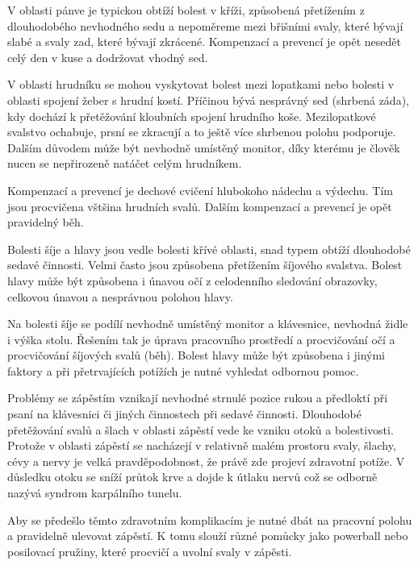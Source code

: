 
V oblasti pánve je typickou obtíží bolest v kříži, způsobená přetížením z dlouhodobého nevhodného sedu a nepoměreme mezi břišními svaly, které bývají slabé a svaly zad, které bývají zkrácené. Kompenzací a prevencí je opět nesedět celý den v kuse a dodržovat vhodný sed. 


V oblasti hrudníku se mohou vyskytovat bolest mezi lopatkami nebo bolesti v oblasti spojení žeber s hrudní kostí. Příčinou bývá nesprávný sed (shrbená záda), kdy dochází k přetěžování kloubních spojení hrudního koše. Mezilopatkové svalstvo ochabuje, prsní se zkracují a to ještě více shrbenou polohu podporuje. Dalším důvodem může být nevhodně umístěný monitor, díky kterému je člověk nucen se nepřirozeně natáčet celým hrudníkem. 

Kompenzací a prevencí je dechové cvičení hlubokoho nádechu a výdechu. Tím jsou procvičena vštšina hrudních svalů. Dalším kompenzací a prevencí je opět pravidelný běh.


Bolesti šíje a hlavy jsou vedle bolesti křívé oblasti, snad typem obtíží dlouhodobé sedavé činnosti. Velmi často jsou způsobena přetížením šíjového svalstva. Bolest hlavy může být způsobena i únavou očí z celodenního sledování obrazovky, celkovou únavou a nesprávnou polohou hlavy.

Na bolesti šíje se podílí nevhodně umístěný monitor a klávesnice, nevhodná židle i výška stolu. Řešením tak je úprava pracovního prostředí a procvičování očí a procvičování šíjových svalů (běh). Bolest hlavy může být způsobena i jinými faktory a při přetrvajících potížích je nutné vyhledat odbornou pomoc.


Problémy se zápěstím vznikají nevhodné strnulé pozice rukou a předloktí při psaní na klávesnici či jiných činnostech při sedavé činnosti. Dlouhodobé přetěžování svalů a šlach v oblasti zápěstí vede ke vzniku otoků a bolestivosti. Protože v oblasti zápěstí se nacházejí v relativně malém prostoru svaly, šlachy, cévy a nervy je velká pravděpodobnost, že právě zde projeví zdravotní potíže. V důsledku otoku se sníží průtok krve a dojde k útlaku nervů což se odborně nazývá syndrom karpálního tunelu. 

Aby se předešlo těmto zdravotním komplikacím je nutné dbát na pracovní polohu a pravidelně ulevovat zápěstí. K tomu slouží různé pomůcky jako powerball nebo posilovací pružiny, které procvičí a uvolní svaly v zápěsti.

